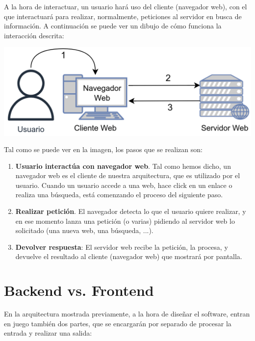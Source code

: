 \documentclass{\ClassPath/viu-tfm-template}
\begin{document}
A la hora de interactuar, un usuario hará uso del cliente (navegador web), con el que interactuará para realizar, normalmente, peticiones al servidor en busca de información. A continuación se puede ver un dibujo de cómo funciona la interacción descrita:


\begin{center}
    \includegraphics[width=0.6\linewidth]{img/cliente_servidor.png}
\end{center}

Tal como se puede ver en la imagen, los pasos que se realizan son:

\begin{enumerate}
    \item \textbf{Usuario interactúa con navegador web}. Tal como hemos dicho, un navegador web es el cliente de nuestra arquitectura, que es utilizado por el usuario. Cuando un usuario accede a una web, hace click en un enlace o realiza una búsqueda,  está comenzando el proceso del siguiente paso.

    \item \textbf{Realizar petición}. El navegador detecta lo que el usuario quiere realizar, y en ese momento lanza una petición (o varias) pidiendo al servidor web lo solicitado (una nueva web, una búsqueda, ...).

    \item \textbf{Devolver respuesta}: El servidor web recibe la petición, la procesa, y devuelve el resultado al cliente (navegador web) que mostrará por pantalla.
\end{enumerate}

\section{Backend vs. Frontend}
En la arquitectura mostrada previamente, a la hora de diseñar el software, entran en juego también dos partes, que se encargarán por separado de procesar la entrada y realizar una salida:
\end{document}
